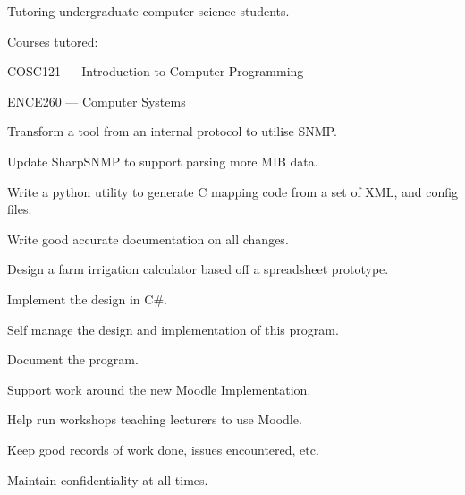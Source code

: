 \documentclass[10pt,a4]{article}
\begin{document}
\begin{sects}
{      

      \begin{packed_items}
        \item{Tutoring undergraduate computer science students.}
        \item{Courses tutored:}
        \begin{packed_items}
          \item{COSC121 --- Introduction to Computer Programming}
          \item{ENCE260 --- Computer Systems}
        \end{packed_items}
      \end{packed_items}

      \begin{packed_items}
        \item{Transform a tool from an internal protocol to utilise SNMP.}
        \item{Update SharpSNMP to support parsing more MIB data.}
        \item{Write a python utility to generate C mapping code from a set of XML, and config files.}
        \item{Write good accurate documentation on all changes.}
      \end{packed_items}

      \begin{packed_items}
        \item{Design a farm irrigation calculator based off a spreadsheet prototype.}
        \item{Implement the design in C\#.}
        \item{Self manage the design and implementation of this program.}
        \item{Document the program.}
      \end{packed_items}


      \begin{packed_items}
        \item{Support work around the new Moodle Implementation.}
        \item{Help run workshops teaching lecturers to use Moodle.}
        \item{Keep good records of work done, issues encountered, etc.}
        \item{Maintain confidentiality at all times.}
      \end{packed_items}
    }


\end{sects}
\end{document}
